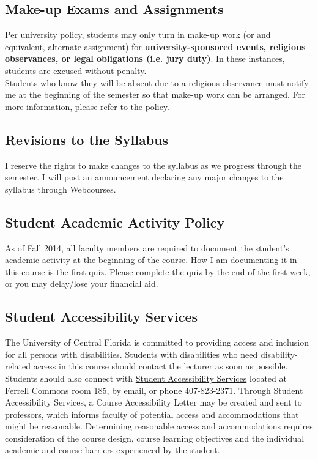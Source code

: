 \documentclass[11pt]{paper}
\begin{document}
\subsection{Make-up Exams and Assignments}
Per university policy, students may only turn in make-up work (or and equivalent, alternate assignment) for \textbf{university-sponsored events, religious observances, or legal obligations (i.e. jury duty)}. In these instances, students are excused without penalty.\\

Students who know they will be absent due to a religious observance must notify me at the beginning of the semester so that make-up work can be arranged. For more information, please refer to the \href{https://regulations.ucf.edu/docs/notices/5.020ReligiousObservancesNEW_Oct09_000.pdf}{policy}.

\subsection{Revisions to the Syllabus}
I reserve the rights to make changes to the syllabus as we progress through the semester. I will post an announcement declaring any major changes to the syllabus through Webcourses.

\subsection{Student Academic Activity Policy}
As of Fall 2014, all faculty members are required to document the student's academic activity at the beginning of the course. How I am documenting it in this course is the first quiz. Please complete the quiz by the end of the first week, or you may delay/lose your financial aid. 
\subsection{Student Accessibility Services}
The University of Central Florida is committed to providing access and inclusion for all persons with disabilities. Students with disabilities who need disability-related access in this course should contact the lecturer as soon as possible. Students should also connect with \href{https://sas.sdes.ucf.edu}{Student Accessibility Services} located at Ferrell Commons room 185, by \href{mailto:emailsas@ucf.edu}{email}, or phone 407-823-2371. Through Student Accessibility Services, a Course Accessibility Letter may be created and sent to professors, which informs faculty of potential access and accommodations that might be reasonable. Determining reasonable access and accommodations requires consideration of the course design, course learning objectives and the individual academic and course barriers experienced by the student.



\end{document}
